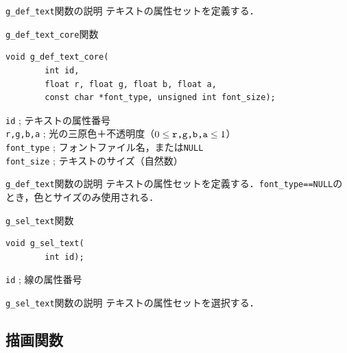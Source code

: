 \documentclass[platex,a4paper,12pt]{jsarticle}%
\begin{document}
\begin{itembox}[l]{\texttt{g\_def\_text}関数の説明}
テキストの属性セットを定義する．
\end{itembox}



\begin{itembox}[l]{\texttt{g\_def\_text\_core}関数}
\begin{verbatim}
void g_def_text_core(
        int id,
        float r, float g, float b, float a,
        const char *font_type, unsigned int font_size);
\end{verbatim}
\verb|id| ; テキストの属性番号\\
\verb|r,g,b,a| ; 光の三原色＋不透明度（$0\leq \verb|r,g,b,a| \leq 1$）\\
\verb|font_type| ; フォントファイル名，または\verb|NULL|\\
\verb|font_size| ; テキストのサイズ（自然数）
\end{itembox}

\begin{itembox}[l]{\texttt{g\_def\_text}関数の説明}
	テキストの属性セットを定義する．\verb|font_type==NULL|のとき，色とサイズのみ使用される．
\end{itembox}

\begin{itembox}[l]{\texttt{g\_sel\_text}関数}
\begin{verbatim}
void g_sel_text(
        int id);
\end{verbatim}
\verb|id| ; 線の属性番号
\end{itembox}

\begin{itembox}[l]{\texttt{g\_sel\_text}関数の説明}
テキストの属性セットを選択する．
\end{itembox}




\clearpage
\subsection{描画関数}
\end{document}
